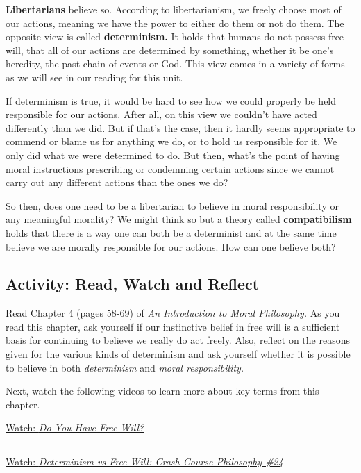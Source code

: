 \documentclass[
]{book}
\begin{document}
\textbf{Libertarians} believe so. According to libertarianism, we freely choose most of our actions, meaning we have the power to either do them or not do them. The opposite view is called \textbf{determinism.} It holds that humans do not possess free will, that all of our actions are determined by something, whether it be one's heredity, the past chain of events or God. This view comes in a variety of forms as we will see in our reading for this unit.

If determinism is true, it would be hard to see how we could properly be held responsible for our actions. After all, on this view we couldn't have acted differently than we did. But if that's the case, then it hardly seems appropriate to commend or blame us for anything we do, or to hold us responsible for it. We only did what we were determined to do. But then, what's the point of having moral instructions prescribing or condemning certain actions since we cannot carry out any different actions than the ones we do?

So then, does one need to be a libertarian to believe in moral responsibility or any meaningful morality? We might think so but a theory called \textbf{compatibilism} holds that there is a way one can both be a determinist and at the same time believe we are morally responsible for our actions. How can one believe both?

\hypertarget{activity-read-watch-and-reflect-3}{%
\subsection*{Activity: Read, Watch and Reflect}\label{activity-read-watch-and-reflect-3}}

\begin{reflect}
Read Chapter 4 (pages 58-69) of \emph{An Introduction to Moral Philosophy.} As you read this chapter, ask yourself if our instinctive belief in free will is a sufficient basis for continuing to believe we really do act freely. Also, reflect on the reasons given for the various kinds of determinism and ask yourself whether it is possible to believe in both \emph{determinism} and \emph{moral responsibility.}

Next, watch the following videos to learn more about key terms from this chapter.

\href{https://www.youtube.com/watch?v=EMdAnU3vYzA\&t=2s}{Watch: \emph{Do You Have Free Will?}}

\begin{center}\rule{0.5\linewidth}{0.5pt}\end{center}

\href{https://www.youtube.com/watch?v=vCGtkDzELAI}{Watch: \emph{Determinism vs Free Will: Crash Course Philosophy \#24}}
\end{reflect}
\end{document}
